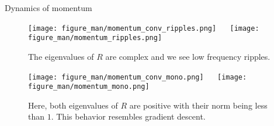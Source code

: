 \documentclass[11pt,compress,t,notes=noshow, xcolor=table]{beamer}
\begin{document}
\begin{vbframe}{Dynamics of momentum}
\framebreak


\framebreak
\vspace*{1.0cm}
\begin{figure}
	\texttt{[image: figure\_man/momentum\_conv\_ripples.png]} ~~ \texttt{[image: figure\_man/momentum\_ripples.png]} \\
	\begin{footnotesize} 
		The eigenvalues of $R$ are complex and we see low frequency ripples. 
	\end{footnotesize}
\end{figure}

\framebreak
\vspace*{1.0cm}
\begin{figure}
	\texttt{[image: figure\_man/momentum\_conv\_mono.png]} ~~ \texttt{[image: figure\_man/momentum\_mono.png]} \\
	\begin{footnotesize} 
		Here, both eigenvalues of $R$ are positive with their norm being less than $1$. This behavior resembles gradient descent. 
	\end{footnotesize}
\end{figure}


\end{vbframe}
\end{document}
